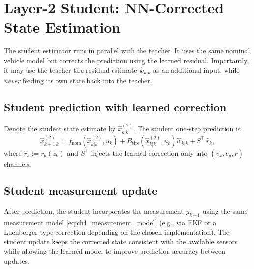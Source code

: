 \section{Layer-2 Student: NN-Corrected State Estimation}\label{ch4_sec_student}

The student estimator runs in parallel with the teacher. It uses the same nominal vehicle model but corrects the prediction using the learned residual. Importantly, it may use the teacher tire-residual estimate $\hat w_{k|k}$ as an additional input, while \emph{never} feeding its own state back into the teacher.

\subsection{Student prediction with learned correction}\label{ch4_subsec_student_pred}
Denote the student state estimate by $\hat x^{(2)}_{k|k}$. The student one-step prediction is
\begin{equation}\label{eq:ch4_student_pred}
    \hat x^{(2)}_{k+1|k} =
    f_{\text{nom}}\!\left(\hat x^{(2)}_{k|k},u_k\right)
    + B_{\text{tire}}\!\left(\hat x^{(2)}_{k|k},u_k\right)\hat w_{k|k}
    + S^{\top}\,\hat r_k,
\end{equation}
where $\hat r_k := r_\theta(z_k)$ and $S^{\top}$ injects the learned correction only into $(v_x,v_y,r)$ channels.

\subsection{Student measurement update}\label{ch4_subsec_student_update}
After prediction, the student incorporates the measurement $y_{k+1}$ using the same measurement model \eqref{eq:ch4_measurement_model} (e.g., via EKF or a Luenberger-type correction depending on the chosen implementation). The student update keeps the corrected state consistent with the available sensors while allowing the learned model to improve prediction accuracy between updates.

